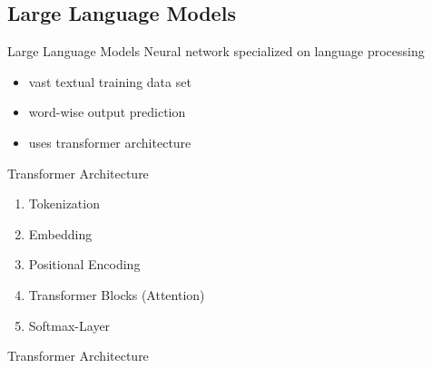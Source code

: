 \subsection{Large Language Models}
\begin{frame}{\insertsubsection{} }
	\begin{fancycolumns}[animation=none]
		\begin{definition}{Large Language Models}
			Neural network specialized on language processing
			\vspace{-1em}
			\begin{itemize}
				\item vast textual training data set
				\item word-wise output prediction
				\item uses transformer architecture
			\end{itemize} 
		\end{definition} \pause
		\begin{note}{Transformer Architecture}
			\begin{enumerate}
				\item Tokenization
				\item Embedding
				\item Positional Encoding
				\item Transformer Blocks (Attention)
				\item Softmax-Layer
			\end{enumerate}
		\end{note} \pause
		\nextcolumn
		\begin{example}{Transformer Architecture}
			\centering{}
		\end{example}
	\end{fancycolumns}
\end{frame}

